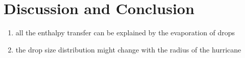 \documentclass[10pt,a4paper]{article}
\begin{document}
\section{Discussion and Conclusion}
\begin{enumerate}
\item all the enthalpy transfer can be explained by the evaporation of drops
\item the drop size distribution might change with the radius of the hurricane
\end{enumerate}

\newpage



\end{document}
